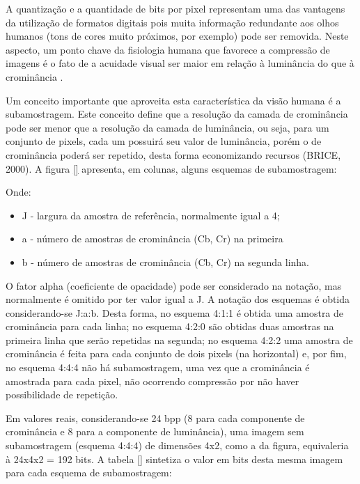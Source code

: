 
A quantização e a quantidade de bits por pixel representam uma das vantagens da utilização de formatos digitais pois muita informação redundante aos olhos humanos (tons de cores muito próximos, por exemplo) pode ser removida. Neste aspecto, um ponto chave da fisiologia humana que favorece a compressão de imagens é o fato de a acuidade visual ser maior em relação à luminância do que à crominância \cite{vandenbranden}.

Um conceito importante que aproveita esta característica da visão humana é a subamostragem. Este conceito define que a resolução da camada de crominância pode ser menor que a resolução da camada de luminância, ou seja, para um conjunto de pixels, cada um possuirá seu valor de luminância, porém o de crominância poderá ser repetido, desta forma economizando recursos (BRICE, 2000). A figura \ref{} apresenta, em colunas, alguns esquemas de subamostragem: %


Onde:
\begin{itemize}
	\item J - largura da amostra de referência, normalmente igual a 4;
	\item a - número de amostras de crominância (Cb, Cr) na primeira 
	\item b - número de amostras de crominância (Cb, Cr) na segunda linha.
\end{itemize}

O fator alpha (coeficiente de opacidade) pode ser considerado na notação, mas normalmente é omitido por ter valor igual a J. A notação dos esquemas é obtida considerando-se J:a:b. Desta forma, no esquema 4:1:1 é obtida uma amostra de crominância para cada linha; no esquema 4:2:0 são obtidas duas amostras na primeira linha que serão repetidas na segunda; no esquema 4:2:2 uma amostra de crominância é feita para cada conjunto de dois pixels (na horizontal) e, por fim, no esquema 4:4:4 não há subamostragem, uma vez que a crominância é amostrada para cada pixel, não ocorrendo compressão por não haver possibilidade de repetição.

Em valores reais, considerando-se 24 bpp (8 para cada componente de crominância e 8 para a componente de luminância), uma imagem sem subamostragem (esquema 4:4:4) de dimensões 4x2, como a da figura, equivaleria à 24x4x2 = 192 bits. A tabela \ref{}  sintetiza o valor em bits desta mesma imagem para cada esquema de subamostragem:


